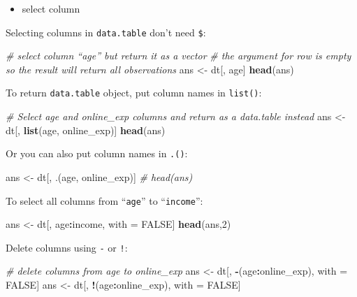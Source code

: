 \documentclass[12pt,]{krantz}
\makeatletter
\newenvironment{Shaded}{\begin{snugshade}}{\end{snugshade}}
\newcommand{\KeywordTok}[1]{\textcolor[rgb]{0.27,0.27,0.27}{\textbf{#1}}}
\newcommand{\DecValTok}[1]{\textcolor[rgb]{0.06,0.06,0.06}{#1}}
\newcommand{\StringTok}[1]{\textcolor[rgb]{0.5,0.5,0.5}{#1}}
\newcommand{\CommentTok}[1]{\textcolor[rgb]{0.37,0.37,0.37}{\textit{#1}}}
\newcommand{\OtherTok}[1]{\textcolor[rgb]{0.37,0.37,0.37}{#1}}
\newcommand{\OperatorTok}[1]{\textcolor[rgb]{0.43,0.43,0.43}{\textbf{#1}}}
\newcommand{\NormalTok}[1]{#1}
\providecommand{\tightlist}{%
  \setlength{\itemsep}{0pt}\setlength{\parskip}{0pt}}
\newenvironment{kframe}{%
\medskip{}
\setlength{\fboxsep}{.8em}
 \def\at@end@of@kframe{}%
 \ifinner\ifhmode%
  \def\at@end@of@kframe{\end{minipage}}%
  \begin{minipage}{\columnwidth}%
 \fi\fi%
 \def\FrameCommand##1{\hskip\@totalleftmargin \hskip-\fboxsep
 \colorbox{shadecolor}{##1}\hskip-\fboxsep
     \hskip-\linewidth \hskip-\@totalleftmargin \hskip\columnwidth}%
 \MakeFramed {\advance\hsize-\width
   \@totalleftmargin\z@ \linewidth\hsize
   \@setminipage}}%
 {\par\unskip\endMakeFramed%
 \at@end@of@kframe}
\renewenvironment{Shaded}{\begin{kframe}}{\end{kframe}}
\theoremstyle{definition}
\theoremstyle{definition}
\theoremstyle{definition}
\theoremstyle{remark}
\makeatother
\begin{document}
\begin{itemize}
\tightlist
\item
  select column
\end{itemize}

Selecting columns in \texttt{data.table} don't need \texttt{\$}:

\begin{Shaded}
\begin{Highlighting}[]
\CommentTok{# select column “age” but return it as a vector}
\CommentTok{# the argument for row is empty so the result will return all observations}
\NormalTok{ans <-}\StringTok{ }\NormalTok{dt[, age]}
\KeywordTok{head}\NormalTok{(ans)}
\end{Highlighting}
\end{Shaded}

To return \texttt{data.table} object, put column names in
\texttt{list()}:

\begin{Shaded}
\begin{Highlighting}[]
\CommentTok{# Select age and online_exp columns and return as a data.table instead}
\NormalTok{ans <-}\StringTok{ }\NormalTok{dt[, }\KeywordTok{list}\NormalTok{(age, online_exp)]}
\KeywordTok{head}\NormalTok{(ans)}
\end{Highlighting}
\end{Shaded}

Or you can also put column names in \texttt{.()}:

\begin{Shaded}
\begin{Highlighting}[]
\NormalTok{ans <-}\StringTok{ }\NormalTok{dt[, .(age, online_exp)]}
\CommentTok{# head(ans)}
\end{Highlighting}
\end{Shaded}

To select all columns from ``\texttt{age}'' to ``\texttt{income}'':

\begin{Shaded}
\begin{Highlighting}[]
\NormalTok{ans <-}\StringTok{ }\NormalTok{dt[, age}\OperatorTok{:}\NormalTok{income, with =}\StringTok{ }\OtherTok{FALSE}\NormalTok{]}
\KeywordTok{head}\NormalTok{(ans,}\DecValTok{2}\NormalTok{)}
\end{Highlighting}
\end{Shaded}

Delete columns using \texttt{-} or \texttt{!}:

\begin{Shaded}
\begin{Highlighting}[]
\CommentTok{# delete columns from  age to online_exp}
\NormalTok{ans <-}\StringTok{ }\NormalTok{dt[, }\OperatorTok{-}\NormalTok{(age}\OperatorTok{:}\NormalTok{online_exp), with =}\StringTok{ }\OtherTok{FALSE}\NormalTok{]}
\NormalTok{ans <-}\StringTok{ }\NormalTok{dt[, }\OperatorTok{!}\NormalTok{(age}\OperatorTok{:}\NormalTok{online_exp), with =}\StringTok{ }\OtherTok{FALSE}\NormalTok{]}
\end{Highlighting}
\end{Shaded}
\end{document}
